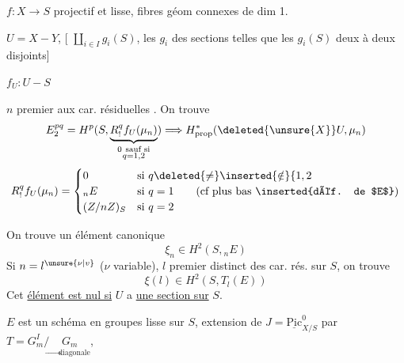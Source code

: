 $f:X\to S$ projectif et lisse, fibres géom connexes de dim 1.

$U=X-Y$,   [ $\coprod_{i\in I}g_i(S)$, les $g_i$ des sections telles que les $g_i(S)$ deux à deux disjoints]

$f_U:U-S$

$n$ premier aux car. résiduelles . On trouve
\[
E^{pq}_{2}=H^p(S,\underbrace{R^q_{!}f_U(\mu_n)}_{\substack{0\ \text{sauf si}\\q=1,2}})\Longrightarrow H^{*}_{\mathrm{prop}}(\deleted{\unsure{X}}U,\mu_n)
\]
\[
R^q_{!}f_U(\mu_n)=
\begin{cases}
0 & \text{si }q\deleted{\ne}\inserted{\notin}\{1,2\\
{}_{n}E & \text{si }q=1\qquad\text{(cf plus bas \inserted{déf. de $E$})}\\
(Z/nZ)_S & \text{si }q=2
\end{cases}
\]

On trouve un élément canonique
\[
\xi_n\in H^2(S,{}_{n}E)
\]
Si $n=l^{\unsure{\nu|v}}$ ($\nu$ variable), $l$ premier distinct des car. rés. sur $S$, on trouve
\[
\boxed{\xi(l)\in H^2(S,T_l(E))}
\]
Cet \uline{élément est nul si} $U$ a \uline{une section sur} $S$.

$E$ est un schéma en groupes lisse sur $S$,   extension de $J=\underline{\mathrm{Pic}}^{0}_{X/S}$ par $T=G_m^{I}/\underset{\longrightarrow\,\text{diagonale}}{G_m}$,

